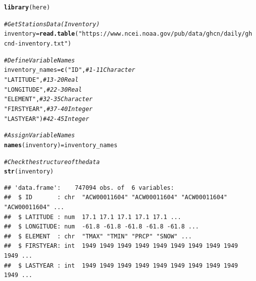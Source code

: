 \documentclass{article}\usepackage[]{graphicx}\usepackage[]{xcolor}
\makeatletter
\newcommand{\hlstr}[1]{\textcolor[rgb]{0.192,0.494,0.8}{#1}}%
\newcommand{\hlcom}[1]{\textcolor[rgb]{0.678,0.584,0.686}{\textit{#1}}}%
\newcommand{\hlstd}[1]{\textcolor[rgb]{0.345,0.345,0.345}{#1}}%
\newcommand{\hlkwb}[1]{\textcolor[rgb]{0.69,0.353,0.396}{#1}}%
\newcommand{\hlkwd}[1]{\textcolor[rgb]{0.737,0.353,0.396}{\textbf{#1}}}%
\newenvironment{kframe}{%
 \def\at@end@of@kframe{}%
 \ifinner\ifhmode%
  \def\at@end@of@kframe{\end{minipage}}%
  \begin{minipage}{\columnwidth}%
 \fi\fi%
 \def\FrameCommand##1{\hskip\@totalleftmargin \hskip-\fboxsep
 \colorbox{shadecolor}{##1}\hskip-\fboxsep
     \hskip-\linewidth \hskip-\@totalleftmargin \hskip\columnwidth}%
 \MakeFramed {\advance\hsize-\width
   \@totalleftmargin\z@ \linewidth\hsize
   \@setminipage}}%
 {\par\unskip\endMakeFramed%
 \at@end@of@kframe}
\newenvironment{knitrout}{}{} %
\makeatother
\begin{document}
\begin{knitrout}
\color{fgcolor}\begin{kframe}
\begin{alltt}
\hlkwd{library}\hlstd{(here)}
\end{alltt}


{\ttfamily\noindent\itshape\color{messagecolor}{\#\# here() starts at /home/mwl04747/RTricks}}\begin{alltt}
\hlcom{# Get Stations Data (Inventory)}
\hlstd{inventory} \hlkwb{=} \hlkwd{read.table}\hlstd{(}\hlstr{"https://www.ncei.noaa.gov/pub/data/ghcn/daily/ghcnd-inventory.txt"}\hlstd{)}

\hlcom{# Define Variable Names}
\hlstd{inventory_names} \hlkwb{=} \hlkwd{c}\hlstd{(}\hlstr{"ID"}\hlstd{,} \hlcom{#            1-11   Character}
                      \hlstr{"LATITUDE"}\hlstd{,} \hlcom{#     13-20   Real}
                      \hlstr{"LONGITUDE"}\hlstd{,} \hlcom{#    22-30   Real}
                      \hlstr{"ELEMENT"}\hlstd{,} \hlcom{#      32-35   Character}
                      \hlstr{"FIRSTYEAR"}\hlstd{,} \hlcom{#    37-40   Integer}
                      \hlstr{"LASTYEAR"}\hlstd{)} \hlcom{#     42-45   Integer}

\hlcom{# Assign Variable Names}
\hlkwd{names}\hlstd{(inventory)} \hlkwb{=} \hlstd{inventory_names}

\hlcom{# Check the structure of the data}
\hlkwd{str}\hlstd{(inventory)}
\end{alltt}
\begin{verbatim}
## 'data.frame':	747094 obs. of  6 variables:
##  $ ID       : chr  "ACW00011604" "ACW00011604" "ACW00011604" "ACW00011604" ...
##  $ LATITUDE : num  17.1 17.1 17.1 17.1 17.1 ...
##  $ LONGITUDE: num  -61.8 -61.8 -61.8 -61.8 -61.8 ...
##  $ ELEMENT  : chr  "TMAX" "TMIN" "PRCP" "SNOW" ...
##  $ FIRSTYEAR: int  1949 1949 1949 1949 1949 1949 1949 1949 1949 1949 ...
##  $ LASTYEAR : int  1949 1949 1949 1949 1949 1949 1949 1949 1949 1949 ...
\end{verbatim}
\end{kframe}
\end{knitrout}
\end{document}
